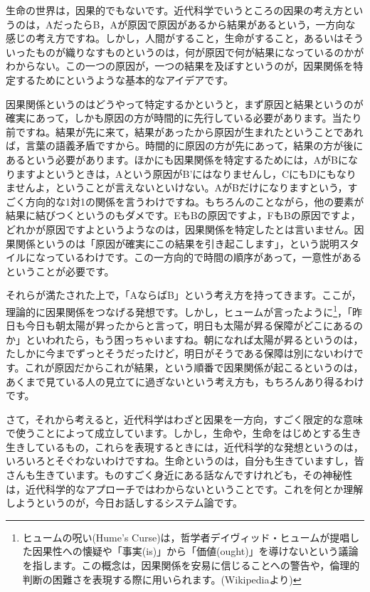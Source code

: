 \documentclass{ltjsbook}
\begin{document}
生命の世界は，因果的でもないです。近代科学でいうところの因果の考え方というのは，AだったらB，Aが原因で原因があるから結果があるという，一方向な感じの考え方ですね。しかし，人間がすること，生命がすること，あるいはそういったものが織りなすものというのは，何が原因で何が結果になっているのかがわからない。この一つの原因が，一つの結果を及ぼすというのが，因果関係を特定するためにというような基本的なアイデアです。

因果関係というのはどうやって特定するかというと，まず原因と結果というのが確実にあって，しかも原因の方が時間的に先行している必要があります。当たり前ですね。結果が先に来て，結果があったから原因が生まれたということであれば，言葉の語義矛盾ですから。時間的に原因の方が先にあって，結果の方が後にあるという必要があります。ほかにも因果関係を特定するためには，AがBになりますよというときは，Aという原因がB'にはなりませんし，CにもDにもなりませんよ，ということが言えないといけない。AがBだけになりますという，すごく方向的な1対1の関係を言うわけですね。もちろんのことながら，他の要素が結果に結びつくというのもダメです。EもBの原因ですよ，FもBの原因ですよ，どれかが原因ですよというようなのは，因果関係を特定したとは言いません。因果関係というのは「原因が確実にこの結果を引き起こします」，という説明スタイルになっているわけです。この一方向的で時間の順序があって，一意性があるということが必要です。

それらが満たされた上で，「AならばB」という考え方を持ってきます。ここが，理論的に因果関係をつなげる発想です。しかし，ヒュームが言ったように\footnote{ヒュームの呪い(Hume's Curse)は，哲学者デイヴィッド・ヒュームが提唱した因果性への懐疑や「事実(is)」から「価値(ought)」を導けないという議論を指します。この概念は，因果関係を安易に信じることへの警告や，倫理的判断の困難さを表現する際に用いられます。(Wikipediaより)}，「昨日も今日も朝太陽が昇ったからと言って，明日も太陽が昇る保障がどこにあるのか」といわれたら，もう困っちゃいますね。朝になれば太陽が昇るというのは，たしかに今までずっとそうだったけど，明日がそうである保障は別にないわけです。これが原因だからこれが結果，という順番で因果関係が起こるというのは，あくまで見ている人の見立てに過ぎないという考え方も，もちろんあり得るわけです。

さて，それから考えると，近代科学はわざと因果を一方向，すごく限定的な意味で使うことによって成立しています。しかし，生命や，生命をはじめとする生き生きしているもの，これらを表現するときには，近代科学的な発想というのは，いろいろとそぐわないわけですね。生命というのは，自分も生きていますし，皆さんも生きています。ものすごく身近にある話なんですけれども，その神秘性は，近代科学的なアプローチではわからないということです。これを何とか理解しようというのが，今日お話しするシステム論です。
\end{document}
